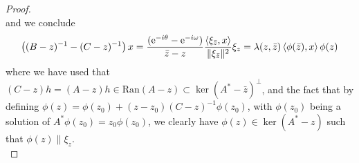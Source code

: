 \documentclass[a4paper,11pt]{article}
\newcommand{\euler}[1]{\text{e}^{#1}}
\newcommand{\Ran}[1]{\text{Ran}\left(#1\right)}
\numberwithin{equation}{section}
\begin{document}
\begin{proof}
\begin{equation}
	\end{equation}
	and we conclude \begin{equation}
		\left((B-z)^{-1}-(C-z)^{-1}\right)x=\frac{(\euler{-i\theta}-\euler{-i\omega})}{\bar{z}-z}\frac{\braket{\xi_{\bar{z}},x}}{\|\xi_{\bar{z}}\|^2}\xi_{z}=\lambda(z,\bar{z})\braket{\phi(\bar{z}),x}\phi(z)
	\end{equation}
	where we have used that $ (C-z)h=(A-z)h\in\Ran{A-z}\subset\ker(A^*-\bar{z})^\perp $, and the fact that by defining $\phi(z)=\phi(z_0)+(z-z_0)(C-z)^{-1}\phi(z_0) $, with $ \phi(z_0) $ being a solution of $ A^*\phi(z_0)=z_0\phi(z_0) $, we clearly have $ \phi(z)\in\ker(A^*-z) $ such that $ \phi(z)\parallel\xi_z $.\\

\end{proof}
\end{document}
